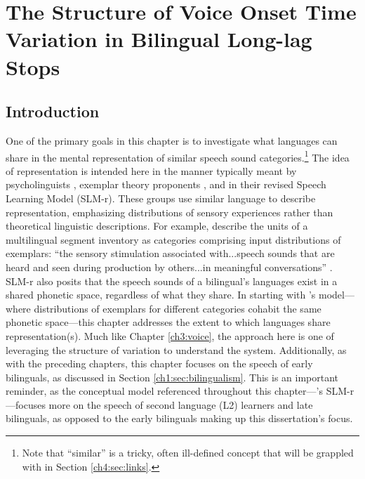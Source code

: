 \setcounter{chapter}{3}

\chapter{The Structure of Voice Onset Time Variation in Bilingual Long-lag Stops}\label{ch4:uniformity}

\section{Introduction}\label{ch4:sec:intro}

One of the primary goals in this chapter is to investigate what languages can share in the mental representation of similar speech sound categories.\footnote{Note that ``similar'' is a tricky, often ill-defined concept that will be grappled with in Section \ref{ch4:sec:links}.} The idea of representation is intended here in the manner typically meant by psycholinguists \citep[e.g.,][]{llompart_2018_acoustic}, exemplar theory proponents \citep[e.g.,][]{amengual_2018_laterals}, and \citet{flege_2021_slmr} in their revised Speech Learning Model (SLM-r). These groups use similar language to describe representation, emphasizing distributions of sensory experiences rather than theoretical linguistic descriptions. For example, \citeauthor{flege_2021_slmr} describe the units of a multilingual segment inventory as categories comprising input distributions of exemplars: ``the sensory stimulation associated with...speech sounds that are heard and seen during production by others...in meaningful conversations'' \citep[][p. 32]{flege_2021_slmr}. SLM-r also posits that the speech sounds of a bilingual's languages exist in a shared phonetic space, regardless of what they share. In starting with \citeauthor{flege_2021_slmr}'s model---where distributions of exemplars for different categories cohabit the same phonetic space---this chapter addresses the extent to which languages share representation(s). Much like Chapter \ref{ch3:voice}, the approach here is one of leveraging the structure of variation to understand the system. Additionally, as with the preceding chapters, this chapter focuses on the speech of early bilinguals, as discussed in Section \ref{ch1:sec:bilingualism}. This is an important reminder, as the conceptual model referenced throughout this chapter---\citeauthor{flege_2021_slmr}'s \citeyearpar{flege_2021_slmr} SLM-r---focuses more on the speech of second language (L2) learners and late bilinguals, as opposed to the early bilinguals making up this dissertation's focus. 

